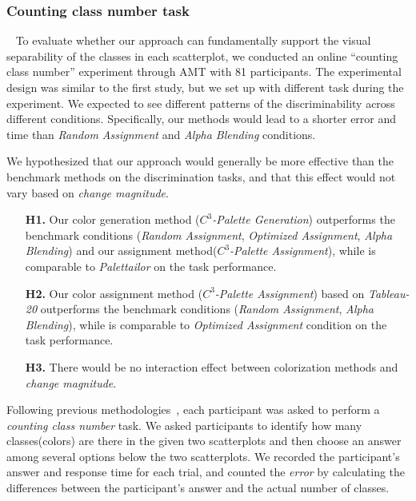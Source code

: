 {\subsubsection{Counting class number task}
\
\newline
To evaluate whether our approach can fundamentally support the visual separability of the classes in each scatterplot, we conducted an online ``counting class number'' experiment through AMT with 81 participants. The experimental design was similar to the first study, but we set up with different task during the experiment.
We expected to see different patterns of the discriminability across different conditions. Specifically, our methods would lead to a shorter error and time than \emph{Random Assignment} and \emph{Alpha Blending} conditions.

\vspace{.3em}
 We hypothesized that our approach would generally be more effective than the benchmark methods on the discrimination tasks, and that this effect would not vary based on \emph{change magnitude}.
\begin{itemize}[noitemsep]
\setlength{\itemsep}{5pt}
    \item[\textbf{H1.}] Our color generation method (\emph{$C^3$-Palette Generation}) outperforms the benchmark conditions (\emph{Random Assignment}, \emph{Optimized Assignment}, \emph{Alpha Blending}) and our assignment method(\emph{$C^3$-Palette Assignment}), while is comparable to  \emph{Palettailor} on the task performance.

    \item [\textbf{H2.}] Our color assignment method (\emph{$C^3$-Palette Assignment}) based on \emph{Tableau-20} outperforms the benchmark conditions (\emph{Random Assignment}, \emph{Alpha Blending}), while is comparable to \emph{Optimized Assignment} condition on the task performance.

    \item [\textbf{H3.}] There would be no interaction effect between colorization methods and \emph{change magnitude}.
\end{itemize}

\vspace{.3em}
Following previous methodologies~\cite{Wang2018, Lu21}, each participant was asked to perform a \emph{counting class number} task.  We asked participants to identify how many classes(colors) are there in the given two scatterplots and then choose an answer among several options below the two scatterplots. We recorded the participant's answer and response time for each trial, and counted the \emph{error}  by calculating the differences between the participant's answer and the actual number of classes.


}
